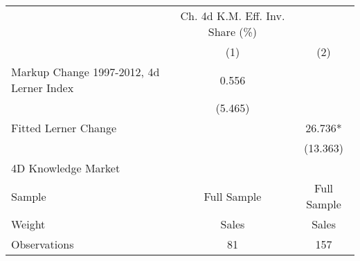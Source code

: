 {
\def\sym#1{\ifmmode^{#1}\else\(^{#1}\)\fi}
\begin{tabular}{l*{2}{c}}
\hline\hline
                    &Ch. 4d K.M. Eff. Inv. Share (\%)   &               \\
                    &\multicolumn{1}{c}{(1)}   &\multicolumn{1}{c}{(2)}   \\
\hline
Markup Change 1997-2012, 4d Lerner Index&       0.556   &               \\
                    &     (5.465)   &               \\
Fitted Lerner Change&               &      26.736*  \\
                    &               &    (13.363)   \\
\hline
4D Knowledge Market &               &               \\
Sample              & Full Sample   & Full Sample   \\
Weight              &       Sales   &       Sales   \\
Observations        &          81   &         157   \\
\hline\hline
\end{tabular}
}
